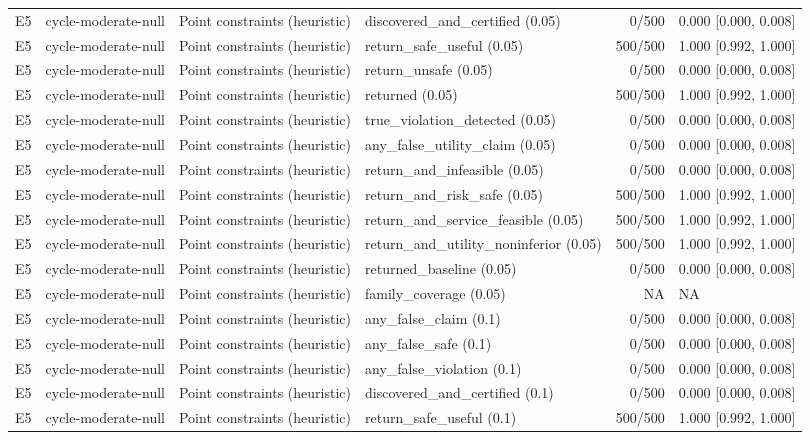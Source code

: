 \begin{longtable}{p{.04\linewidth}p{.18\linewidth}p{.19\linewidth}p{.16\linewidth}r p{.21\linewidth}}
E5 & cycle-moderate-null & Point constraints (heuristic) & discovered\_and\_certified (0.05) & 0/500 & 0.000 [0.000, 0.008]\\
E5 & cycle-moderate-null & Point constraints (heuristic) & return\_safe\_useful (0.05) & 500/500 & 1.000 [0.992, 1.000]\\
E5 & cycle-moderate-null & Point constraints (heuristic) & return\_unsafe (0.05) & 0/500 & 0.000 [0.000, 0.008]\\
E5 & cycle-moderate-null & Point constraints (heuristic) & returned (0.05) & 500/500 & 1.000 [0.992, 1.000]\\
E5 & cycle-moderate-null & Point constraints (heuristic) & true\_violation\_detected (0.05) & 0/500 & 0.000 [0.000, 0.008]\\
E5 & cycle-moderate-null & Point constraints (heuristic) & any\_false\_utility\_claim (0.05) & 0/500 & 0.000 [0.000, 0.008]\\
E5 & cycle-moderate-null & Point constraints (heuristic) & return\_and\_infeasible (0.05) & 0/500 & 0.000 [0.000, 0.008]\\
E5 & cycle-moderate-null & Point constraints (heuristic) & return\_and\_risk\_safe (0.05) & 500/500 & 1.000 [0.992, 1.000]\\
E5 & cycle-moderate-null & Point constraints (heuristic) & return\_and\_service\_feasible (0.05) & 500/500 & 1.000 [0.992, 1.000]\\
E5 & cycle-moderate-null & Point constraints (heuristic) & return\_and\_utility\_noninferior (0.05) & 500/500 & 1.000 [0.992, 1.000]\\
E5 & cycle-moderate-null & Point constraints (heuristic) & returned\_baseline (0.05) & 0/500 & 0.000 [0.000, 0.008]\\
E5 & cycle-moderate-null & Point constraints (heuristic) & family\_coverage (0.05) & NA & NA\\
E5 & cycle-moderate-null & Point constraints (heuristic) & any\_false\_claim (0.1) & 0/500 & 0.000 [0.000, 0.008]\\
E5 & cycle-moderate-null & Point constraints (heuristic) & any\_false\_safe (0.1) & 0/500 & 0.000 [0.000, 0.008]\\
E5 & cycle-moderate-null & Point constraints (heuristic) & any\_false\_violation (0.1) & 0/500 & 0.000 [0.000, 0.008]\\
E5 & cycle-moderate-null & Point constraints (heuristic) & discovered\_and\_certified (0.1) & 0/500 & 0.000 [0.000, 0.008]\\
E5 & cycle-moderate-null & Point constraints (heuristic) & return\_safe\_useful (0.1) & 500/500 & 1.000 [0.992, 1.000]\\

\end{longtable}
